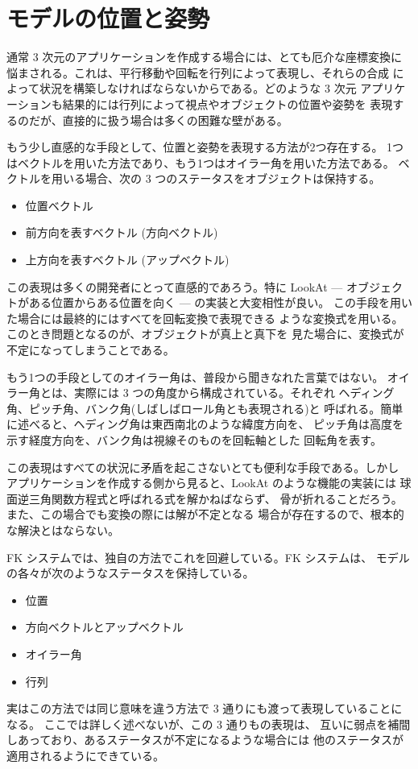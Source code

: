 \section{モデルの位置と姿勢}
通常 3 次元のアプリケーションを作成する場合には、とても厄介な座標変換に
悩まされる。これは、平行移動や回転を行列によって表現し、それらの合成
によって状況を構築しなければならないからである。どのような 3 次元
アプリケーションも結果的には行列によって視点やオブジェクトの位置や姿勢を
表現するのだが、直接的に扱う場合は多くの困難な壁がある。

もう少し直感的な手段として、位置と姿勢を表現する方法が2つ存在する。
1つはベクトルを用いた方法であり、もう1つはオイラー角を用いた方法である。
ベクトルを用いる場合、次の 3 つのステータスをオブジェクトは保持する。
\begin{itemize}
 \item 位置ベクトル
 \item 前方向を表すベクトル (方向ベクトル)
 \item 上方向を表すベクトル (アップベクトル)
\end{itemize}
この表現は多くの開発者にとって直感的であろう。特に LookAt ---
オブジェクトがある位置からある位置を向く --- の実装と大変相性が良い。
この手段を用いた場合には最終的にはすべてを回転変換で表現できる
ような変換式を用いる。このとき問題となるのが、オブジェクトが真上と真下を
見た場合に、変換式が不定になってしまうことである。

もう1つの手段としてのオイラー角は、普段から聞きなれた言葉ではない。
オイラー角とは、実際には 3 つの角度から構成されている。それぞれ
ヘディング角、ピッチ角、バンク角(しばしばロール角とも表現される)と
呼ばれる。簡単に述べると、ヘディング角は東西南北のような緯度方向を、
ピッチ角は高度を示す経度方向を、バンク角は視線そのものを回転軸とした
回転角を表す。

この表現はすべての状況に矛盾を起こさないとても便利な手段である。しかし
アプリケーションを作成する側から見ると、LookAt のような機能の実装には
球面逆三角関数方程式と呼ばれる式を解かねばならず、
骨が折れることだろう。また、この場合でも変換の際には解が不定となる
場合が存在するので、根本的な解決とはならない。

FK システムでは、独自の方法でこれを回避している。FK システムは、
モデルの各々が次のようなステータスを保持している。
\begin{itemize}
 \item 位置
 \item 方向ベクトルとアップベクトル
 \item オイラー角
 \item 行列
\end{itemize}
実はこの方法では同じ意味を違う方法で 3 通りにも渡って表現していることになる。
ここでは詳しく述べないが、この 3 通りもの表現は、
互いに弱点を補間しあっており、あるステータスが不定になるような場合には
他のステータスが適用されるようにできている。

